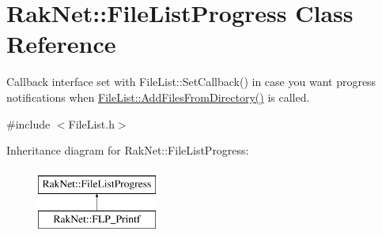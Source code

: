\hypertarget{class_rak_net_1_1_file_list_progress}{\section{Rak\-Net\-:\-:File\-List\-Progress Class Reference}
\label{class_rak_net_1_1_file_list_progress}
}


Callback interface set with File\-List\-::\-Set\-Callback() in case you want progress notifications when \hyperlink{class_rak_net_1_1_file_list_a9ff81c1d5fb8ad1897fd6b6b12108cf8}{File\-List\-::\-Add\-Files\-From\-Directory()} is called.  




{\ttfamily \#include $<$File\-List.\-h$>$}

Inheritance diagram for Rak\-Net\-:\-:File\-List\-Progress\-:\begin{figure}[H]
\begin{center}
\leavevmode
\includegraphics[height=2.000000cm]{class_rak_net_1_1_file_list_progress}
\end{center}
\end{figure}
